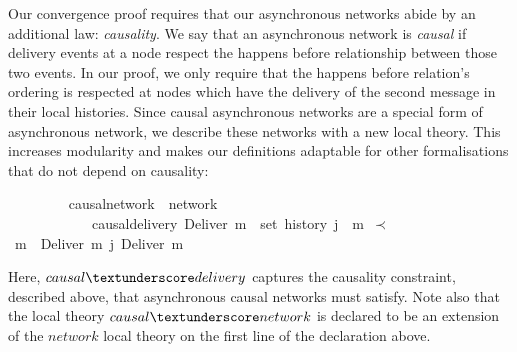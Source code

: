 \documentclass[acmlarge,review,anonymous]{acmart}\settopmatter{printfolios=true}
\begin{document}
\vspace{\baselineskip}
Our convergence proof requires that our asynchronous networks abide by an additional law: \emph{causality}.
We say that an asynchronous network is \emph{causal} if delivery events at a node respect the happens before relationship between those two events.
In our proof, we only require that the happens before relation's ordering is respected at nodes which have the delivery of the second message in their local histories.
Since causal asynchronous networks are a special form of asynchronous network, we describe these networks with a new local theory.
This increases modularity and makes our definitions adaptable for other formalisations that do not depend on causality:
\\
\begin{isabellebody}
\ \ \ \ \ \ \ \  causal{\isacharunderscore}network\ {\isacharequal}\ network\ {\isacharplus}\isanewline
\ \ \ \ \ \ \ \ \ \ \ \ causal{\isacharunderscore}delivery{\isacharcolon}\ {\isachardoublequoteopen}Deliver\ m{}\ {\isasymin}\ set\ {\isacharparenleft}history\ j{\isacharparenright}\ {\isasymLongrightarrow}\ m{}\ $\prec$\ m{}\ {\isasymLongrightarrow}\ Deliver\ m{}\ {\isasymsqsubset}\isactrlsup j\ Deliver\ m{}{\isachardoublequoteclose}
\end{isabellebody}
\vspace{\baselineskip}
Here, $causal{\isacharunderscore}delivery$ captures the causality constraint, described above, that asynchronous causal networks must satisfy.
Note also that the local theory $causal{\isacharunderscore}network$ is declared to be an extension of the $network$ local theory on the first line of the declaration above.
\end{document}
